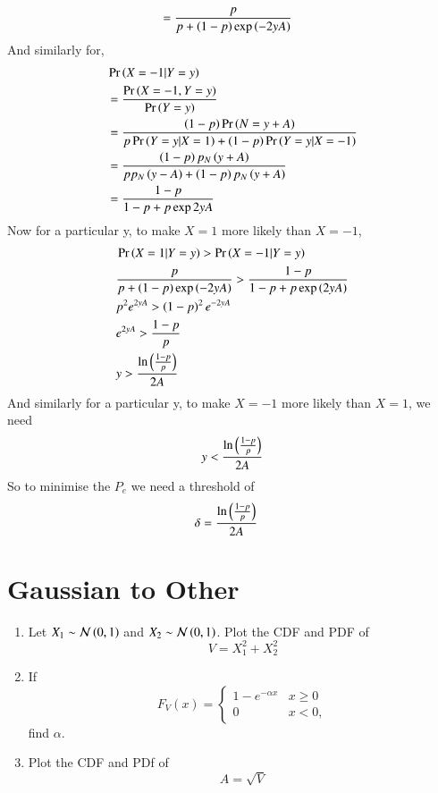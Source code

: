 \documentclass[journal,12pt,twocolumn]{IEEEtran}
\renewcommand\thesection{\arabic{section}}
\begin{document}
\begin{enumerate}[label=\thesection.\arabic*,ref=\thesection.\theenumi]
\begin{enumerate}[label=\thesection.\arabic*
,ref=\thesection.\theenumi]
\begin{align}
		      &= \frac{p}{p + \left(1-p\right)\exp\left(-2yA\right)}
       \end{align}
       And similarly for,
       \begin{align}
	          &\Pr\left(X=-1|Y=y\right) \\
	          &= \frac{\Pr\left(X=-1,Y=y\right)}{\Pr\left(Y=y\right)}\\
		      &= \frac{\left(1-p\right)\Pr\left(N = y +A\right)}{p\Pr\left(Y=y|X=1\right) +\left(1-p\right)\Pr\left(Y=y|X=-1\right)}\\
		      &= \frac{\left(1-p\right)p_{N}\left(y+A\right)}{pp_{N}\left(y-A\right) + \left(1-p\right)p_{N}\left(y+A\right)}\\
              &= \frac{1-p}{1-p+ p\exp{2yA}}
       \end{align}
       Now for a particular y, to make $X = 1$ more likely than $X= -1$,
        \begin{align}
	   &\Pr\left(X=1|Y=y\right) > \Pr\left(X=-1|Y=y\right)\\
	   &\frac{p}{p + \left(1-p\right)\exp\left(-2yA\right)} >\frac{1-p}{1-p+ p\exp\left(2yA\right)}\\
	   &p^2e^{2yA} > \left(1-p\right)^{2}e^{-2yA}\\
       &e^{2yA} >\frac{1-p}{p}\\
	   &y > \frac{\ln{\ensuremath{\left(\frac{1-p}{p}\right)}}}{2A}
	\end{align}
	And similarly for a particular y, to make $X=-1$ more likely than $X=1$, we need
	 \begin{align}
		 y < \frac{\ln{\ensuremath{\left(\frac{1-p}{p}\right)}}}{2A}
         \end{align}
	 So to minimise the $P_e$ we need a threshold of
	  \begin{align}
		  \delta &= \frac{\ln{\ensuremath{\left(\frac{1-p}{p}\right)}}}{2A}
          \end{align}		   
  \end{enumerate}
\section{Gaussian to Other}
\begin{enumerate}[label=\thesection.\arabic*
,ref=\thesection.\theenumi]
\item
Let $X_1 \sim  \mathcal{N}\left(0,1\right)$ and $X_2 \sim  \mathcal{N}\left(0,1\right)$. Plot the CDF and PDF of
%
\begin{equation}
V = X_1^2 + X_2^2
\end{equation}
%
%
%
\item
If
%
\begin{equation}
F_{V}(x) =
\begin{cases}
1 - e^{-\alpha x} & x \geq 0 \\
0 & x < 0,
\end{cases}
\end{equation}
%
find $\alpha$.
%
\item
\label{ch3_raleigh_sim}
Plot the CDF and PDf of
%
\begin{equation}
A = \sqrt{V}
\end{equation}
%
\end{enumerate}

\end{enumerate}
\end{document}

